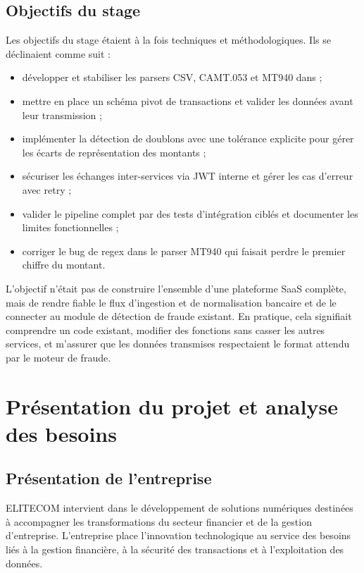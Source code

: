 \documentclass[12pt,a4paper]{extreport}
\begin{document}
\section{Objectifs du stage}

Les objectifs du stage étaient à la fois techniques et méthodologiques. Ils se déclinaient comme suit :

\begin{itemize}
    \item développer et stabiliser les parsers CSV, CAMT.053 et MT940 dans  ;
    \item mettre en place un schéma pivot de transactions et valider les données avant leur transmission ;
    \item implémenter la détection de doublons avec une tolérance explicite pour gérer les écarts de représentation des montants ;
    \item sécuriser les échanges inter-services via JWT interne et gérer les cas d'erreur avec retry ;
    \item valider le pipeline complet par des tests d'intégration ciblés et documenter les limites fonctionnelles ;
    \item corriger le bug de regex dans le parser MT940 qui faisait perdre le premier chiffre du montant.
\end{itemize}

L'objectif n'était pas de construire l'ensemble d'une plateforme SaaS complète, mais de rendre fiable le flux d'ingestion et de normalisation bancaire et de le connecter au module de détection de fraude existant. En pratique, cela signifiait comprendre un code existant, modifier des fonctions sans casser les autres services, et m'assurer que les données transmises respectaient le format attendu par le moteur de fraude.

\chapter{Présentation du projet et analyse des besoins}

\section{Présentation de l'entreprise}

ELITECOM intervient dans le développement de solutions numériques destinées à accompagner les transformations du secteur financier et de la gestion d'entreprise. L'entreprise place l'innovation technologique au service des besoins liés à la gestion financière, à la sécurité des transactions et à l'exploitation des données.
\end{document}
